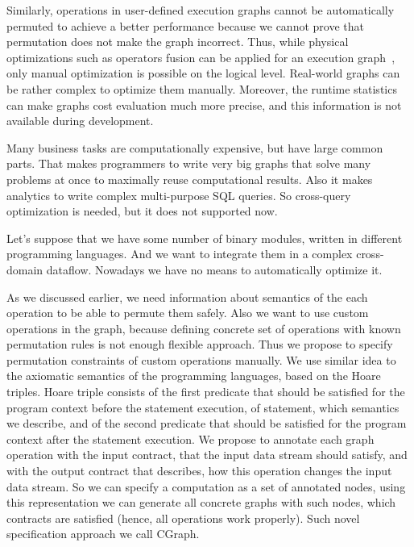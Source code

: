 Similarly, operations in user-defined execution graphs cannot be automatically permuted to achieve a better performance because we cannot prove that permutation does not make the graph incorrect. Thus, while physical optimizations such as operators fusion can be applied for an execution graph~\cite{grulich2020grizzly}, only manual optimization is possible on the logical level. Real-world graphs can be rather complex to optimize them manually. Moreover, the runtime statistics can make graphs cost evaluation much more precise, and this information is not available during development.



Many business tasks are computationally expensive, but have large common parts.
That makes programmers to write very big graphs that solve many problems at once to maximally reuse computational results.
Also it makes analytics to write complex multi-purpose SQL queries.
So cross-query optimization is needed, but it does not supported now.

Let's suppose that we have some number of binary modules, written in different programming languages.
And we want to integrate them in a complex cross-domain dataflow.
Nowadays we have no means to automatically optimize it.

As we discussed earlier, we need information about semantics of the each operation to be able to permute them safely.
Also we want to use custom operations in the graph, because defining concrete set of operations with known permutation rules is not enough flexible approach.
Thus we propose to specify permutation constraints of custom operations manually.
We use similar idea to the axiomatic semantics of the programming languages, based on the Hoare triples.
Hoare triple consists of the first predicate that should be satisfied for the program context before the statement execution, of statement, which semantics we describe, and of the second predicate that should be satisfied for the program context after the statement execution.
We propose to annotate each graph operation with the input contract, that the input data stream should satisfy, and with the output contract that describes, how this operation changes the input data stream.
So we can specify a computation as a set of annotated nodes, using this representation we can generate all concrete graphs with such nodes, which contracts are satisfied (hence, all operations work properly).
Such novel specification approach we call CGraph.


